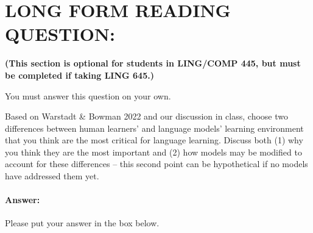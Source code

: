\documentclass[10pt]{article}
\begin{document}
\newpage
\section*{LONG FORM READING QUESTION:} 
\textbf{(This section is optional for students in LING/COMP 445, but must be completed if taking LING 645.)}

You must answer this question on your own.

Based on Warstadt \& Bowman 2022 and our discussion in class, choose two differences between human learners' and language models' learning environment that you think are the most critical for language learning. Discuss both (1) why you think they are the most important and (2) how models may be modified to account for these differences -- this second point can be hypothetical if no models have addressed them yet. 

\paragraph{Answer:} Please put your answer in the box below.
\end{document}
